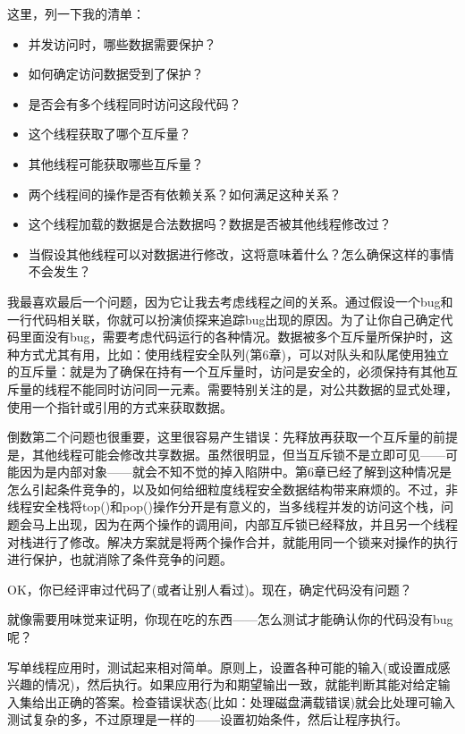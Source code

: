 这里，列一下我的清单：

\begin{itemize}
    \item 并发访问时，哪些数据需要保护？
    \item 如何确定访问数据受到了保护？
    \item 是否会有多个线程同时访问这段代码？
    \item 这个线程获取了哪个互斥量？
    \item 其他线程可能获取哪些互斥量？
    \item 两个线程间的操作是否有依赖关系？如何满足这种关系？
    \item 这个线程加载的数据是合法数据吗？数据是否被其他线程修改过？
    \item 当假设其他线程可以对数据进行修改，这将意味着什么？怎么确保这样的事情不会发生？
\end{itemize}

我最喜欢最后一个问题，因为它让我去考虑线程之间的关系。通过假设一个bug和一行代码相关联，你就可以扮演侦探来追踪bug出现的原因。为了让你自己确定代码里面没有bug，需要考虑代码运行的各种情况。数据被多个互斥量所保护时，这种方式尤其有用，比如：使用线程安全队列(第6章)，可以对队头和队尾使用独立的互斥量：就是为了确保在持有一个互斥量时，访问是安全的，必须保持有其他互斥量的线程不能同时访问同一元素。需要特别关注的是，对公共数据的显式处理，使用一个指针或引用的方式来获取数据。

倒数第二个问题也很重要，这里很容易产生错误：先释放再获取一个互斥量的前提是，其他线程可能会修改共享数据。虽然很明显，但当互斥锁不是立即可见——可能因为是内部对象——就会不知不觉的掉入陷阱中。第6章已经了解到这种情况是怎么引起条件竞争的，以及如何给细粒度线程安全数据结构带来麻烦的。不过，非线程安全栈将top()和pop()操作分开是有意义的，当多线程并发的访问这个栈，问题会马上出现，因为在两个操作的调用间，内部互斥锁已经释放，并且另一个线程对栈进行了修改。解决方案就是将两个操作合并，就能用同一个锁来对操作的执行进行保护，也就消除了条件竞争的问题。

OK，你已经评审过代码了(或者让别人看过)。现在，确定代码没有问题？

就像需要用味觉来证明，你现在吃的东西——怎么测试才能确认你的代码没有bug呢？


写单线程应用时，测试起来相对简单。原则上，设置各种可能的输入(或设置成感兴趣的情况)，然后执行。如果应用行为和期望输出一致，就能判断其能对给定输入集给出正确的答案。检查错误状态(比如：处理磁盘满载错误)就会比处理可输入测试复杂的多，不过原理是一样的——设置初始条件，然后让程序执行。

